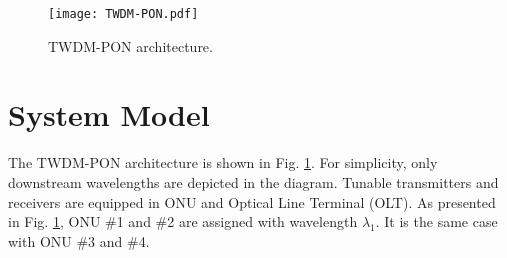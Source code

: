 \documentclass[letter]{IEEEtran}
\begin{document}
%



\begin{figure}
	\centering
	\texttt{[image: TWDM-PON.pdf]}\\
	\caption{TWDM-PON architecture.}
	\label{architecture}
	\vspace{-6.0mm}
\end{figure}
\vspace{-2.0mm}

\section{System Model}
The TWDM-PON architecture is shown in Fig. \ref{architecture}. For simplicity, only downstream wavelengths are depicted in the diagram. Tunable transmitters and receivers are equipped in ONU and Optical Line Terminal (OLT). As presented in Fig. \ref{architecture}, ONU \#1 and \#2 are assigned with wavelength $\lambda_{1}$. It is the same case with ONU \#3 and \#4.
\end{document}
